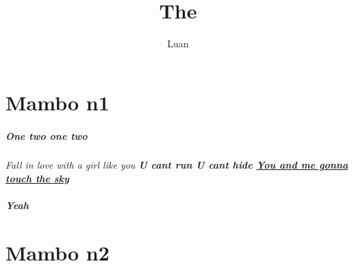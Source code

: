 \documentclass[11pt, a4paper]{article}
\title{The}
\author{Luan}
\begin{document}
\maketitle

\chapter{Mambo n1}
\paragraph{One two one two}
\it{Fall in love with a girl like you}
\bf{U cant run U cant hide}
\underline{You and me gonna touch the sky}
\paragraph{Yeah}

\chapter{Mambo n2}
\end{document}

